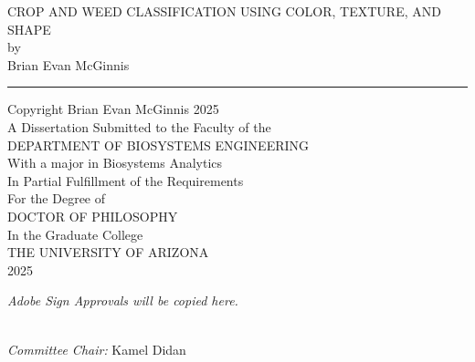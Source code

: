 \documentclass[letterpaper]{report}
\begin{document}
\begin{center}
\huge
CROP AND WEED CLASSIFICATION USING COLOR, TEXTURE, AND SHAPE \\
\large
{} 
\vspace{3cm}
by\\
Brian Evan McGinnis \\
\vspace{1cm}
\hrule
\vspace{1cm}
Copyright \textcopyright  Brian Evan McGinnis 2025 \\
A Dissertation Submitted to the Faculty of the \\
DEPARTMENT OF BIOSYSTEMS ENGINEERING \\
With a major in Biosystems Analytics \\
In Partial Fulfillment of the Requirements \\
For the Degree of \\
DOCTOR OF PHILOSOPHY \\
In the Graduate College \\
THE UNIVERSITY OF ARIZONA \\
2025 \\
\end{center}
\newpage
%
\begin{center}
\huge
\textit{Adobe Sign Approvals will be copied here.} \\\
\end{center}
\textit{Committee Chair:} Kamel Didan
\newpage

%
%

\tableofcontents
\listoffigures
\listoftables

\clearpage
\setlength{\glsdescwidth}{0.95\linewidth}

\printglossary[type=acronym]

\newpage
\end{document}
